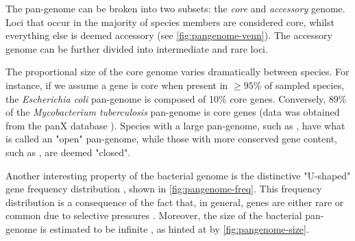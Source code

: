 The pan-genome can be broken into two subsets: the \emph{core} and \emph{accessory} genome. Loci that occur in the majority of species members are considered core, whilst everything else is deemed accessory (see \autoref{fig:pangenome-venn}). The accessory genome can be further divided into intermediate and rare loci. 

The proportional size of the core genome varies dramatically between species. For instance, if we assume a gene is core when present in $\ge 95$\% of sampled species, the \textit{Escherichia coli} pan-genome is composed of 10\% core genes. Conversely, 89\% of the \textit{Mycobacterium tuberculosis} pan-genome is core genes (data was obtained from the panX database \cite{panx}). Species with a large pan-genome, such as \ecoli{}, have what is called an "open" pan-genome, while those with more conserved gene content, such as \mtb{}, are deemed "closed". 

Another interesting property of the bacterial genome is the distinctive "U-shaped" gene frequency distribution \cite{Lobkovsky2013,pandora,Lapierre2009}, shown in \autoref{fig:pangenome-freq}. This frequency distribution is a consequence of the fact that, in general, genes are either rare or common due to selective pressures \cite{Lobkovsky2013,thepangenome2020}. Moreover, the size of the bacterial pan-genome is estimated to be infinite \cite{Lapierre2009}, as hinted at by \autoref{fig:pangenome-size}.

